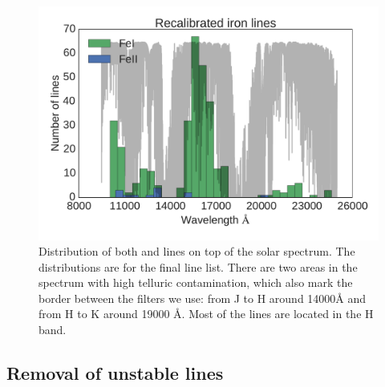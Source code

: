 \documentclass{aa}
\begin{document}
\begin{figure}[tpb]
    \centering
    \includegraphics[width=1.05\linewidth]{figures/EWvsEP_cut.pdf}
    \caption{Distribution of both  and  lines on top of the solar
    spectrum. The distributions are for the final line list.
    There are two areas in the spectrum with high telluric
    contamination, which also mark the border between the filters we
    use: from J to H around 14000\si{\angstrom} and from H to K around
    19000 \si{\angstrom}. Most of the lines are located in the H band.}
    \label{fig:Fe1_after_recal}
\end{figure}


\subsection{Removal of unstable lines}
\label{sub:removal_of_unstable_lines}
\end{document}
